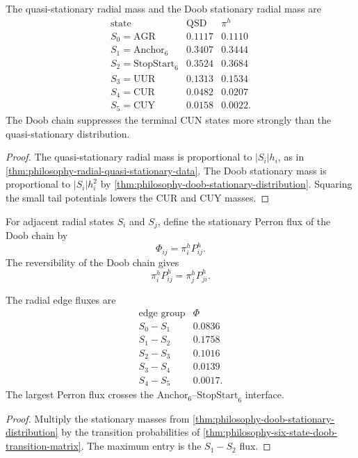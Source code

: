 \begin{theorem}
\label{thm:philosophy-qsd-doob-residence-differ}
The quasi-stationary radial mass and the Doob stationary radial mass are
$$
\begin{array}{c|r|r}
  \text{state} & \text{QSD} & \pi^{h}\\
  \hline
  S_{0}=\mathrm{AGR} & 0.1117 & 0.1110\\
  S_{1}=\mathrm{Anchor}_{6} & 0.3407 & 0.3444\\
  S_{2}=\mathrm{StopStart}_{6} & 0.3524 & 0.3684\\
  S_{3}=\mathrm{UUR} & 0.1313 & 0.1534\\
  S_{4}=\mathrm{CUR} & 0.0482 & 0.0207\\
  S_{5}=\mathrm{CUY} & 0.0158 & 0.0022.
\end{array}
$$
The Doob chain suppresses the terminal CUN states more strongly than the
quasi-stationary distribution.
\end{theorem}
\begin{proof}
The quasi-stationary radial mass is proportional to $|S_{i}|h_{i}$, as
in \autoref{thm:philosophy-radial-quasi-stationary-data}. The Doob
stationary mass is proportional to $|S_{i}|h_{i}^{2}$ by
\autoref{thm:philosophy-doob-stationary-distribution}. Squaring the
small tail potentials lowers the $\mathrm{CUR}$ and $\mathrm{CUY}$
masses.
\end{proof}

\begin{definition}
\label{def:philosophy-perron-edge-flux}
For adjacent radial states $S_{i}$ and $S_{j}$, define the stationary
Perron flux of the Doob chain by
$$
  \Phi_{ij}=\pi^{h}_{i}P^{h}_{ij}.
$$
The reversibility of the Doob chain gives
$$
  \pi^{h}_{i}P^{h}_{ij}=\pi^{h}_{j}P^{h}_{ji}.
$$
\end{definition}

\begin{theorem}
\label{thm:philosophy-perron-flux-concentration}
The radial edge fluxes are
$$
\begin{array}{c|r}
  \text{edge group} & \Phi\\
  \hline
  S_{0}-S_{1} & 0.0836\\
  S_{1}-S_{2} & 0.1758\\
  S_{2}-S_{3} & 0.1016\\
  S_{3}-S_{4} & 0.0139\\
  S_{4}-S_{5} & 0.0017.
\end{array}
$$
The largest Perron flux crosses the
$\mathrm{Anchor}_{6}$--$\mathrm{StopStart}_{6}$ interface.
\end{theorem}
\begin{proof}
Multiply the stationary masses from
\autoref{thm:philosophy-doob-stationary-distribution} by the transition
probabilities of
\autoref{thm:philosophy-six-state-doob-transition-matrix}. The maximum
entry is the $S_{1}-S_{2}$ flux.
\end{proof}

